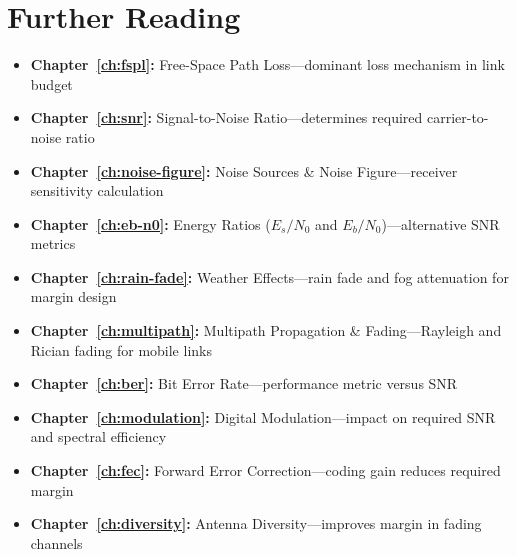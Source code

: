 \section{Further Reading}

\begin{itemize}
\item \textbf{Chapter~\ref{ch:fspl}:} Free-Space Path Loss---dominant loss mechanism in link budget
\item \textbf{Chapter~\ref{ch:snr}:} Signal-to-Noise Ratio---determines required carrier-to-noise ratio
\item \textbf{Chapter~\ref{ch:noise-figure}:} Noise Sources \& Noise Figure---receiver sensitivity calculation
\item \textbf{Chapter~\ref{ch:eb-n0}:} Energy Ratios ($E_s/N_0$ and $E_b/N_0$)---alternative SNR metrics
\item \textbf{Chapter~\ref{ch:rain-fade}:} Weather Effects---rain fade and fog attenuation for margin design
\item \textbf{Chapter~\ref{ch:multipath}:} Multipath Propagation \& Fading---Rayleigh and Rician fading for mobile links
\item \textbf{Chapter~\ref{ch:ber}:} Bit Error Rate---performance metric versus SNR
\item \textbf{Chapter~\ref{ch:modulation}:} Digital Modulation---impact on required SNR and spectral efficiency
\item \textbf{Chapter~\ref{ch:fec}:} Forward Error Correction---coding gain reduces required margin
\item \textbf{Chapter~\ref{ch:diversity}:} Antenna Diversity---improves margin in fading channels
\end{itemize}
